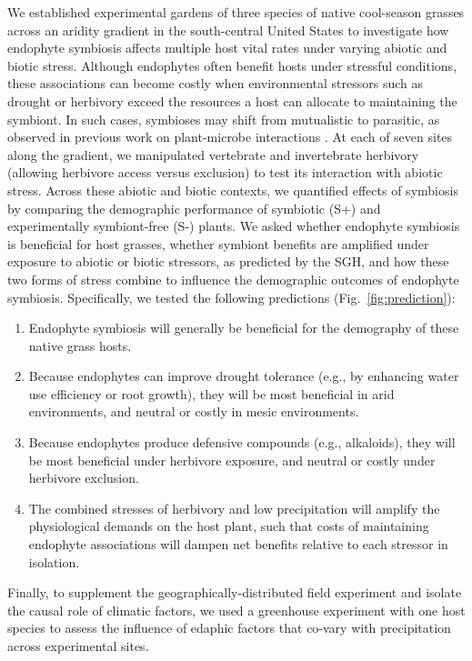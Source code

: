 \documentclass[12pt]{article}\usepackage[]{graphicx}\usepackage[dvipsnames]{xcolor}
\begin{document}
We established experimental gardens of three species of native cool-season grasses across an aridity gradient in the south-central United States to investigate how endophyte symbiosis affects multiple host vital rates under varying abiotic and biotic stress. 
Although endophytes often benefit hosts under stressful conditions, these associations can become costly when environmental stressors such as drought or herbivory exceed the resources a host can allocate to maintaining the symbiont. 
In such cases, symbioses may shift from mutualistic to parasitic, as observed in previous work on plant-microbe interactions \citep{johnson1997functioning}.
At each of seven sites along the gradient, we manipulated vertebrate and invertebrate herbivory (allowing herbivore access versus exclusion) to test its interaction with abiotic stress.
Across these abiotic and biotic contexts, we quantified effects of symbiosis by comparing the demographic performance of symbiotic (S+) and experimentally symbiont-free (S-) plants. 
We asked whether endophyte symbiosis is beneficial for host grasses, whether symbiont benefits are amplified under exposure to abiotic or biotic stressors, as predicted by the SGH, and how these two forms of stress combine to influence the demographic outcomes of endophyte symbiosis.
Specifically, we tested the following predictions (Fig.~\ref{fig:prediction}): 
\begin{enumerate}
	\item Endophyte symbiosis will generally be beneficial for the demography of these native grass hosts.
	\item Because endophytes can improve drought tolerance (e.g., by enhancing water use efficiency or root growth), they will be most beneficial in arid environments, and neutral or costly in mesic environments.
	\item Because endophytes produce defensive compounds (e.g., alkaloids), they will be most beneficial under herbivore exposure, and neutral or costly under herbivore exclusion.
	\item The combined stresses of herbivory and low precipitation will amplify the physiological demands on the host plant, such that costs of maintaining endophyte associations will dampen net benefits relative to each stressor in isolation.
\end{enumerate}
Finally, to supplement the geographically-distributed field experiment and isolate the causal role of climatic factors, we used a greenhouse experiment with one host species to assess the influence of edaphic factors that co-vary with precipitation across experimental sites. 
\end{document}
